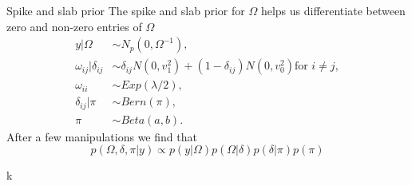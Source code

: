 \documentclass{beamer}
\begin{document}
\begin{frame}{Spike and slab prior}
	The spike and slab prior for $\Omega$ helps us differentiate between zero
	and non-zero entries of $\Omega$
	\begin{align*}
		y | \Omega                & \sim N_p(0, \Omega^{-1}),                                                          \\
		\omega_{ij} | \delta_{ij} & \sim \delta_{ij} N(0, v_1^2) + (1 - \delta_{ij}) N(0, v_0^2) \text{for } i \neq j, \\
		\omega_{ii}               & \sim Exp(\lambda/2),                                                               \\
		\delta_{ij} | \pi         & \sim Bern(\pi),                                                                    \\
		\pi                       & \sim Beta(a,b).
	\end{align*}
	After a few manipulations we find that
	\[ p(\Omega, \delta, \pi | y) \propto p(y | \Omega) p(\Omega | \delta) p(\delta | \pi) p(\pi) \]
\end{frame}
\begin{frame}
	k
\end{frame}
\end{document}
